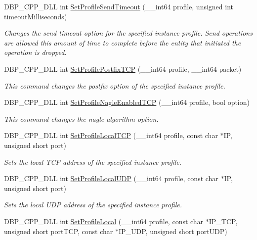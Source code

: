 \begin{DoxyCompactItemize}
DBP\_\-CPP\_\-DLL int \hyperlink{namespacemn_afdce8fa11b7c1689deb1c2274e5f5f38}{SetProfileSendTimeout} (\_\-\_\-int64 profile, unsigned int timeoutMilliseconds)
\begin{DoxyCompactList}\small\item\em Changes the send timeout option for the specified instance profile. Send operations are allowed this amount of time to complete before the entity that initiated the operation is dropped. \item\end{DoxyCompactList}\item 
DBP\_\-CPP\_\-DLL int \hyperlink{namespacemn_a1934cbe74210d9d2911170ded6a0a978}{SetProfilePostfixTCP} (\_\-\_\-int64 profile, \_\-\_\-int64 packet)
\begin{DoxyCompactList}\small\item\em This command changes the postfix option of the specified instance profile. \item\end{DoxyCompactList}\item 
DBP\_\-CPP\_\-DLL int \hyperlink{namespacemn_ae50662bc5a7f605697468cd7f65fc7ab}{SetProfileNagleEnabledTCP} (\_\-\_\-int64 profile, bool option)
\begin{DoxyCompactList}\small\item\em This command changes the nagle algorithm option. \item\end{DoxyCompactList}\item 
DBP\_\-CPP\_\-DLL int \hyperlink{namespacemn_a0764e70a254c557b528e1fa4a9d16a4d}{SetProfileLocalTCP} (\_\-\_\-int64 profile, const char $\ast$IP, unsigned short port)
\begin{DoxyCompactList}\small\item\em Sets the local TCP address of the specified instance profile. \item\end{DoxyCompactList}\item 
DBP\_\-CPP\_\-DLL int \hyperlink{namespacemn_ac0972b0ace59cbdec2c987d1028ae2e2}{SetProfileLocalUDP} (\_\-\_\-int64 profile, const char $\ast$IP, unsigned short port)
\begin{DoxyCompactList}\small\item\em Sets the local UDP address of the specified instance profile. \item\end{DoxyCompactList}\item 
DBP\_\-CPP\_\-DLL int \hyperlink{namespacemn_ab3a68a1529a25353794e70ac1892b016}{SetProfileLocal} (\_\-\_\-int64 profile, const char $\ast$IP\_\-TCP, unsigned short portTCP, const char $\ast$IP\_\-UDP, unsigned short portUDP)

\end{DoxyCompactItemize}

